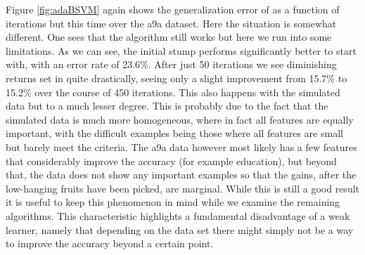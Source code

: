 \newpage
\par Figure \ref{fig:adaBSVM} again shows the generalization error of \adaB as a function of iterations but this time over the a9a dataset. Here the situation is somewhat different. One sees that the algorithm still works but here we run into some limitations. As we can see, the initial stump performs significantly better to start with, with an error rate of 23.6\%. After just 50 iterations we see diminishing returns set in quite drastically, seeing only a slight improvement from 15.7\% to 15.2\% over the course of 450 iterations. This also happens with the simulated data but to a much lesser degree. This is probably due to the fact that the simulated data is much more homogeneous, where in fact all features are equally important, with the difficult examples being those where all features are small but barely meet the criteria. The a9a data however most likely has a few features that considerably improve the accuracy (for example education), but beyond that, the data does not show any important examples so that the gains, after the low-hanging fruits have been picked, are marginal. While this is still a good result it is useful to keep this phenomenon in mind while we examine the remaining algorithms. This characteristic highlights a fundamental disadvantage of a weak learner, namely that depending on the data set there might simply not be a way to improve the accuracy beyond a certain point. 

